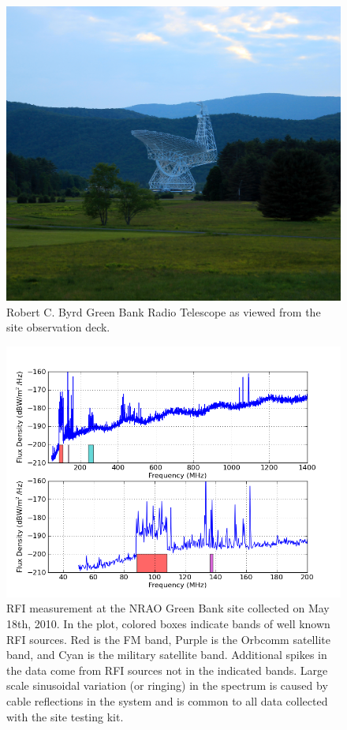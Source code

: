 \begin{figure}[htb]
\begin{minipage}[b]{0.47\textwidth}
\includegraphics[width=0.95\linewidth]{RFI_testing/figures/gbt_site.jpg}
\caption{Robert C. Byrd Green Bank Radio Telescope as viewed from the site observation deck. }
\label{Fig:gbt}
\end{minipage}
\end{figure}

\begin{figure}[htb]
\begin{center}
\includegraphics[width=0.9\linewidth]{RFI_testing/figures/GBT_bands.png}
\caption{RFI measurement at the NRAO Green Bank site collected on May 18th, 2010. In the plot, colored boxes indicate bands of well known RFI sources. Red is the FM band, Purple is the Orbcomm satellite band, and Cyan is the military satellite band. Additional spikes in the data come from RFI sources not in the indicated bands. Large scale sinusoidal variation (or ringing) in the spectrum is caused by cable reflections in the system and is common to all data collected with the site testing kit. }
\label{Fig:gbtrfi}
\end{center}
\end{figure}


